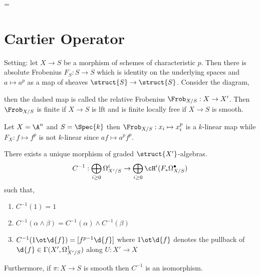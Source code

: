=\documentclass[12pt]{article}
\begin{document}
\section{Cartier Operator}

Setting: let $X \to S$ be a morphism of schemes of characteristic $p$. Then there is absolute Frobenius $F_S : S \to S$ which is identity on the underlying spaces and $a \mapsto a^p$ as a map of sheaves $\struct{S} \to \struct{S}$. Consider the diagram,
\begin{center}
\end{center}
then the dashed map is called the relative Frobenius $\Frob_{X/S} : X \to X'$. Then $\Frob_{X/S}$ is finite if $X \to S$ is lft and is finite locally free if $X \to S$ is smooth. 

\begin{example}
Let $X = \A^n$ and $S = \Spec{k}$ then $\Frob_{X/S} : x_i \mapsto x_i^p$ is a $k$-linear map while $F_X : f \mapsto f^p$ is not $k$-linear since $a f \mapsto a^p f^p$. 
\end{example}

\begin{theorem}[Cartier]
There exists a unique morphism of graded $\struct{X'}$-algebras.
\[ C^{-1} : \bigoplus_{i \ge 0} \Omega_{X'/S}^i \to \bigoplus_{i \ge 0} \cH^i(F_* \Omega^\bullet_{X/S}) \]
such that,
\begin{enumerate}
\item $C^{-1}(1) = 1$
\item $C^{-1}(\alpha \wedge \beta) = C^{-1}(\alpha) \wedge C^{-1}(\beta)$
\item $C^{-1}(1 \ot \d{f}) = [f^{p-1} \d{f}]$ where $1 \ot \d{f}$ denotes the pullback of $\d{f} \in \Gamma(X', \Omega_{X'/S}^1)$ along $ U : X' \to X$
\end{enumerate}
Furthermore, if $\pi : X \to S$ is smooth then $C^{-1}$ is an isomorphism. 
\end{theorem}
\end{document}
